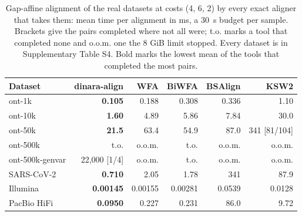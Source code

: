 \documentclass[nocrop,noinfo]{bioinfo}
\begin{document}
\begin{table}[t]
\caption{Gap-affine alignment of the real datasets at costs (4, 6, 2) by every exact aligner that takes them: mean time per alignment in ms, a 30~s budget per sample. Brackets give the pairs completed where not all were; t.o. marks a tool that completed none and o.o.m. one the 8 GiB limit stopped. Every dataset is in Supplementary Table S4. Bold marks the lowest mean of the tools that completed the most pairs.}\label{tab:affine}
\centering\footnotesize
\setlength{\tabcolsep}{4pt}
\begin{tabular}{@{}lrrrrr@{}}
\toprule
Dataset & dinara-align & WFA & BiWFA & BSAlign & KSW2 \\
\midrule
ont-1k & \textbf{0.105} & 0.188 & 0.308 & 0.336 & 1.10 \\
ont-10k & \textbf{1.60} & 4.89 & 5.86 & 7.84 & 30.0 \\
ont-50k & \textbf{21.5} & 63.4 & 54.9 & 87.0 & 341 [81/104] \\
ont-500k & t.o. & o.o.m. & t.o. & o.o.m. & o.o.m. \\
ont-500k-genvar & 22{,}000 [1/4] & o.o.m. & t.o. & o.o.m. & o.o.m. \\
SARS-CoV-2 & \textbf{0.710} & 2.05 & 1.78 & 341 & 87.9 \\
Illumina & \textbf{0.00145} & 0.00155 & 0.00281 & 0.0539 & 0.0128 \\
PacBio HiFi & \textbf{0.0950} & 0.227 & 0.231 & 86.0 & 9.72 \\
\bottomrule
\end{tabular}
\end{table}
\end{document}

